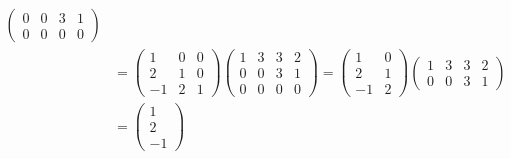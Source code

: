 ﻿\documentclass{book} \usepackage{exsheets} \usepackage{xeCJK}
\begin{document}
\begin{solution}
\begin{align*}
\begin{pmatrix}
                                        0&0&3&1\\
                                        0&0&0&0
                                      \end{pmatrix}\\&=
                                                       \begin{pmatrix}
                                                         1&0&0\\
                                                         2&1&0\\
                                                         -1&2&1
                                                       \end{pmatrix}
                                                               \begin{pmatrix}
                                                                 1&3&3&2\\
                                                                 0&0&3&1\\
                                                                 0&0&0&0
                                                               \end{pmatrix}=
                                                                        \begin{pmatrix}
                                                                          1&0\\
                                                                          2&1\\
                                                                          -1&2
                                                                        \end{pmatrix}
                                                                              \begin{pmatrix}
                                                                                1&3&3&2\\
                                                                                0&0&3&1
                                                                              \end{pmatrix}
  \\&=
      \begin{pmatrix}
        1\\
        2\\
        -1
      \end{pmatrix}

\end{align*}
\end{solution}
\end{document}
